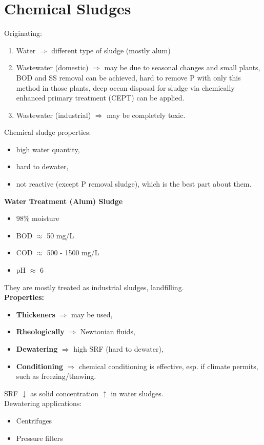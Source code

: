 \documentclass{article}
\numberwithin{equation}{section}
\begin{document}
\section{Chemical Sludges} \label{section:chemicalsludges}
Originating:
\begin{enumerate}
    \item Water $\Rightarrow$ different type of sludge (mostly alum)
    \item Wastewater (domestic) $\Rightarrow$ may be due to seasonal changes and small plants, BOD and SS removal can be achieved, hard to remove P with only this method in those plants, deep ocean disposal for sludge via chemically enhanced primary treatment (CEPT) can be applied.
    \item Wastewater (industrial) $\Rightarrow$ may be completely toxic.
\end{enumerate}
Chemical sludge properties:
\begin{itemize}
    \item high water quantity,
    \item hard to dewater,
    \item not reactive (except P removal sludge), which is the best part about them.
\end{itemize}
\textbf{Water Treatment (Alum) Sludge}
\begin{itemize}
    \item 98\% moisture
    \item BOD $\approx$ 50 mg/L
    \item COD $\approx$ 500 - 1500 mg/L
    \item pH $\approx$ 6
\end{itemize}
They are mostly treated as industrial sludges, landfilling.\\
\textbf{Properties:}
\begin{itemize}
    \item \textbf{Thickeners} $\Rightarrow$ may be used,
    \item \textbf{Rheologically} $\Rightarrow$ Newtonian fluids,
    \item \textbf{Dewatering} $\Rightarrow$ high SRF (hard to dewater),
    \item \textbf{Conditioning} $\Rightarrow$ chemical conditioning is effective, esp. if climate permits, such as freezing/thawing.
\end{itemize}
SRF $\downarrow$ as solid concentration $\uparrow$ in water sludges.\\
Dewatering applications:
\begin{itemize}
    \item Centrifuges
    \item Pressure filters
\end{itemize}
\end{document}
